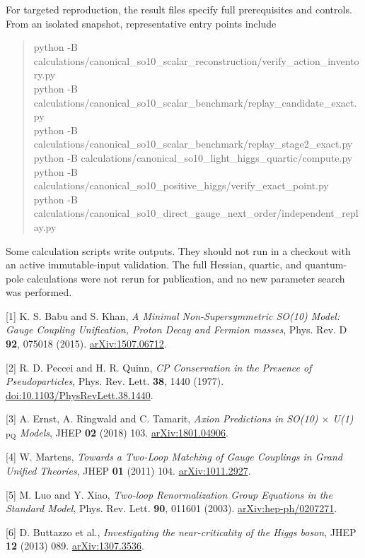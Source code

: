 \documentclass[10pt,letterpaper]{article}
\newcommand{\PQ}{\mathrm{PQ}}
\newcommand{\sect}[1]{\vspace{5pt}{\large\bfseries\color{ink}#1}\par}
\begin{document}
For targeted reproduction, the result files specify full prerequisites and
controls. From an isolated snapshot, representative entry points include
\begin{quote}\small\ttfamily
python -B calculations/canonical\_so10\_scalar\_reconstruction/verify\_action\_inventory.py\\
python -B calculations/canonical\_so10\_scalar\_benchmark/replay\_candidate\_exact.py\\
python -B calculations/canonical\_so10\_scalar\_benchmark/replay\_stage2\_exact.py\\
python -B calculations/canonical\_so10\_light\_higgs\_quartic/compute.py\\
python -B calculations/canonical\_so10\_positive\_higgs/verify\_exact\_point.py\\
python -B calculations/canonical\_so10\_direct\_gauge\_next\_order/independent\_replay.py
\end{quote}
Some calculation scripts write outputs. They should not run in a checkout with
an active immutable-input validation. The full Hessian, quartic, and quantum-pole
calculations were not rerun for publication, and no new parameter search was performed.

\sect{References}
{\small\setlength{\parskip}{3pt}
[1] K. S. Babu and S. Khan, \emph{A Minimal Non-Supersymmetric SO(10) Model:
Gauge Coupling Unification, Proton Decay and Fermion masses},
Phys. Rev. D \textbf{92}, 075018 (2015).
\href{https://arxiv.org/abs/1507.06712}{arXiv:1507.06712}.

[2] R. D. Peccei and H. R. Quinn, \emph{CP Conservation in the Presence of
Pseudoparticles}, Phys. Rev. Lett. \textbf{38}, 1440 (1977).
\href{https://doi.org/10.1103/PhysRevLett.38.1440}{doi:10.1103/PhysRevLett.38.1440}.

[3] A. Ernst, A. Ringwald and C. Tamarit, \emph{Axion Predictions in
SO(10) $\times$ U(1)$_{\PQ}$ Models}, JHEP \textbf{02} (2018) 103.
\newline\href{https://arxiv.org/abs/1801.04906}{arXiv:1801.04906}.

[4] W. Martens, \emph{Towards a Two-Loop Matching of Gauge Couplings in
Grand Unified Theories}, JHEP \textbf{01} (2011) 104.
\href{https://arxiv.org/abs/1011.2927}{arXiv:1011.2927}.

[5] M. Luo and Y. Xiao, \emph{Two-loop Renormalization Group Equations in
the Standard Model}, Phys. Rev. Lett. \textbf{90}, 011601 (2003).
\href{https://arxiv.org/abs/hep-ph/0207271}{arXiv:hep-ph/0207271}.

[6] D. Buttazzo et al., \emph{Investigating the near-criticality of the Higgs
boson}, JHEP \textbf{12} (2013) 089.
\href{https://arxiv.org/abs/1307.3536}{arXiv:1307.3536}.
}
\end{document}
